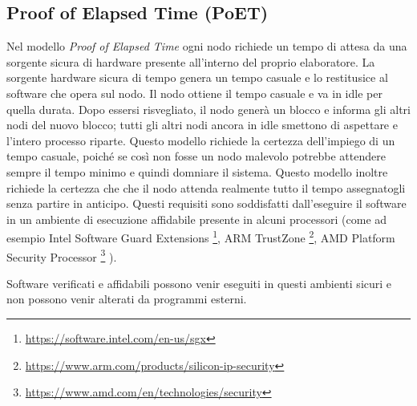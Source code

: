\subsection{Proof of Elapsed Time (PoET)}
Nel modello \textit{Proof of Elapsed Time} ogni nodo richiede un tempo di attesa da una
sorgente sicura di hardware presente all'interno del proprio elaboratore. La sorgente hardware
sicura di tempo genera un tempo casuale e lo restitusice al software che opera sul nodo.
Il nodo ottiene il tempo casuale e va in idle per quella durata. Dopo essersi risvegliato,
il nodo generà un blocco e informa gli altri nodi del nuovo blocco; tutti gli altri nodi ancora
in idle smettono di aspettare e l'intero processo riparte.
Questo modello richiede la certezza dell'impiego di un tempo casuale, poiché se così non fosse
un nodo malevolo potrebbe attendere sempre il tempo minimo e quindi domniare il sistema.
Questo modello inoltre richiede la certezza che che il nodo attenda realmente tutto il tempo
assegnatogli senza partire in anticipo.
Questi requisiti sono soddisfatti dall'eseguire il software in un ambiente di esecuzione affidabile
presente in alcuni processori
(come ad esempio Intel Software Guard Extensions
\footnote{\href{https://software.intel.com/en-us/sgx}{https://software.intel.com/en-us/sgx}},
ARM TrustZone
\footnote{\href{https://www.arm.com/products/silicon-ip-security}{https://www.arm.com/products/silicon-ip-security}},
AMD Platform Security Processor
\footnote{\href{https://www.amd.com/en/technologies/security}{https://www.amd.com/en/technologies/security}}
).

Software verificati e affidabili possono venir eseguiti in questi ambienti sicuri e non possono venir
alterati da programmi esterni.

